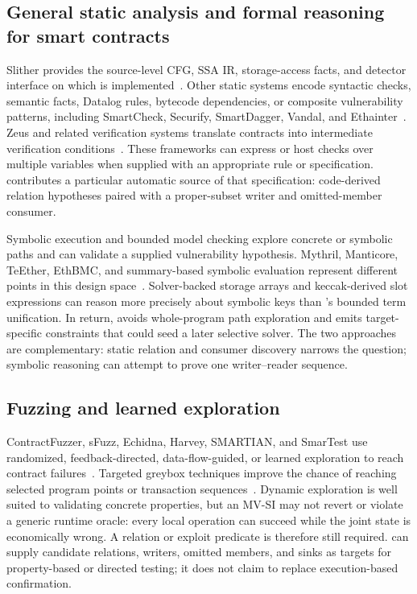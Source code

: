 \subsection{General static analysis and formal reasoning for smart contracts}
\label{s:related-static}

Slither provides the source-level CFG, SSA IR, storage-access facts, and detector interface on which \sys is implemented~\cite{feist2019slither}. Other static systems encode syntactic checks, semantic facts, Datalog rules, bytecode dependencies, or composite vulnerability patterns, including SmartCheck, Securify, SmartDagger, Vandal, and Ethainter~\cite{tikhomirov2018smartcheck,tsankov2018securify,liao2022smartdagger,brent2018vandal,brent2020ethainter}. Zeus and related verification systems translate contracts into intermediate verification conditions~\cite{kalra2018zeus}. These frameworks can express or host checks over multiple variables when supplied with an appropriate rule or specification. \sys contributes a particular automatic source of that specification: code-derived relation hypotheses paired with a proper-subset writer and omitted-member consumer.

Symbolic execution and bounded model checking explore concrete or symbolic paths and can validate a supplied vulnerability hypothesis. Mythril, Manticore, TeEther, EthBMC, and summary-based symbolic evaluation represent different points in this design space~\cite{mythril,manticore,krupp2018teether,frank2020ethbmc,feng2020summary}. Solver-backed storage arrays and keccak-derived slot expressions can reason more precisely about symbolic keys than \sys{}'s bounded term unification. In return, \sys avoids whole-program path exploration and emits target-specific constraints that could seed a later selective solver. The two approaches are complementary: static relation and consumer discovery narrows the question; symbolic reasoning can attempt to prove one writer--reader sequence.

\subsection{Fuzzing and learned exploration}
\label{s:related-fuzzing}

ContractFuzzer, sFuzz, Echidna, Harvey, SMARTIAN, and SmarTest use randomized, feedback-directed, data-flow-guided, or learned exploration to reach contract failures~\cite{jiang2018contractfuzzer,nguyen2020sfuzz,echidna,wustholz2020harvey,choi2021smartian,so2021smartest}. Targeted greybox techniques improve the chance of reaching selected program points or transaction sequences~\cite{wustholz2020targeted}. Dynamic exploration is well suited to validating concrete properties, but an MV-SI may not revert or violate a generic runtime oracle: every local operation can succeed while the joint state is economically wrong. A relation or exploit predicate is therefore still required. \sys can supply candidate relations, writers, omitted members, and sinks as targets for property-based or directed testing; it does not claim to replace execution-based confirmation.

